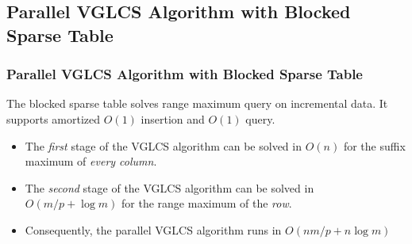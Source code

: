 \subsection{Parallel VGLCS Algorithm with Blocked Sparse Table}
\begin{frame}
	\frametitle{Parallel VGLCS Algorithm with Blocked Sparse Table}
	The blocked sparse table solves range maximum query on incremental
	data.  It supports amortized $O(1)$ insertion and $O(1)$ query.
	\begin{itemize}
		\setlength\itemsep{1em}
		\item 
			The {\em first} stage of the VGLCS algorithm can be solved
			in $O(n)$ for the suffix maximum of {\em every column}.
		\item 
			The {\em second} stage of the VGLCS algorithm can be solved
			in $O(m/p + \log m)$ for the range maximum of the {\em row}.
		\item
			Consequently, the parallel VGLCS algorithm runs in $O(nm/p+n\log m)$
	\end{itemize}
\end{frame}